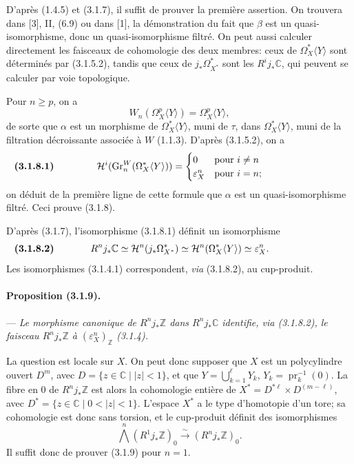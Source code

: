 \documentclass[10pt]{article}
\newcommand{\C}{\mathbb C}
\newcommand{\Z}{\mathbb Z}
\newcommand{\Gr}{\operatorname{Gr}}
\begin{document}
D'après (1.4.5) et (3.1.7), il suffit de prouver la première assertion. On trouvera dans [3], II, (6.9) ou dans [1], la démonstration du fait que $\beta$ est un quasi-isomorphisme, donc un quasi-isomorphisme filtré. On peut aussi calculer directement les faisceaux de cohomologie des deux membres: ceux de $\Omega_X^*\langle Y\rangle$ sont déterminés par (3.1.5.2), tandis que ceux de $j_*\Omega_{X^*}^*$ sont les $R^ij_*\C$, qui peuvent se calculer par voie topologique.

Pour $n\ge p$, on a
\[
W_n(\Omega_X^p\langle Y\rangle)=\Omega_X^p\langle Y\rangle,
\]
de sorte que $\alpha$ est un morphisme de $\Omega_X^*\langle Y\rangle$, muni de $\tau$, dans $\Omega_X^*\langle Y\rangle$, muni de la filtration décroissante associée à $W$ (1.1.3). D'après (3.1.5.2), on a
\[
\makebox[\textwidth][s]{\textbf{(3.1.8.1)}\hfill$\displaystyle \mathcal H^i(\Gr_n^W(\Omega_X^*\langle Y\rangle))=\begin{cases}0&\text{pour }i\ne n\\ \varepsilon_X^n&\text{pour }i=n;\end{cases}$\hfill\phantom{\textbf{(3.1.8.1)}}}
\]
on déduit de la première ligne de cette formule que $\alpha$ est un quasi-isomorphisme filtré. Ceci prouve (3.1.8).

D'après (3.1.7), l'isomorphisme (3.1.8.1) définit un isomorphisme
\[
\makebox[\textwidth][s]{\textbf{(3.1.8.2)}\hfill$\displaystyle R^nj_*\C\simeq \mathcal H^n(j_*\Omega_{X^*}^*)\simeq \mathcal H^n(\Omega_X^*\langle Y\rangle)\simeq \varepsilon_X^n.$\hfill\phantom{\textbf{(3.1.8.2)}}}
\]
Les isomorphismes (3.1.4.1) correspondent, \emph{via} (3.1.8.2), au cup-produit.

\paragraph{Proposition (3.1.9).} --- {\itshape Le morphisme canonique de $R^nj_*\Z$ dans $R^nj_*\C$ identifie, via (3.1.8.2), le faisceau $R^nj_*\Z$ à $(\varepsilon_X^n)_\Z$ (3.1.4).}

La question est locale sur $X$. On peut donc supposer que $X$ est un polycylindre ouvert $D^m$, avec $D=\{z\in\C\mid |z|<1\}$, et que $Y=\bigcup_{k=1}^{\ell}Y_k$, $Y_k=\operatorname{pr}_k^{-1}(0)$. La fibre en $0$ de $R^nj_*\Z$ est alors la cohomologie entière de $X^*=D^{*\ell}\times D^{(m-\ell)}$, avec $D^*=\{z\in\C\mid 0<|z|<1\}$.
L'espace $X^*$ a le type d'homotopie d'un tore; sa cohomologie est donc sans torsion, et le cup-produit définit des isomorphismes
\[
\bigwedge^n(R^1j_*\Z)_0\xrightarrow{\sim}(R^nj_*\Z)_0.
\]
Il suffit donc de prouver (3.1.9) pour $n=1$.
\end{document}
